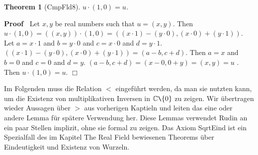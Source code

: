 \documentclass{article}
\newenvironment{forthel}{\begin{leftbar}}{\end{leftbar}}
\newenvironment{proof}{\noindent\textbf{Proof\ }}{\hspace*{\fill}$\Box$\medskip}
\newtheorem{theorem}{Theorem}
\newcommand{\CC}{\mathbb{C}}
\newcommand{\cmul}{\cdot}
\begin{document}
\begin{forthel}
\begin{theorem}[CmpFld8] $u \cmul (1,0) = u$.
\end{theorem}\begin{proof}
 Let $x,y$ be real numbers such that $u = (x,y)$.\newline
 Then $u  \cmul  (1,0) = ((x,y))  \cmul  (1,0) = ((x \cdot 1)-(y \cdot 0) , (x \cdot 0)+(y \cdot 1))$. \newline
Let $a = x \cdot 1$ and $b = y \cdot 0$ and $c = x \cdot 0$ and $d = y \cdot 1$.\newline
$((x \cdot 1)-(y \cdot 0) , (x \cdot 0)+(y \cdot 1)) = (a-b, c+d)$.\newline
Then $a = x$ and $b = 0$ and $c = 0$ and $d = y$.\newline
$(a-b, c+d) = (x-0 , 0+y) = (x,y) = u$ .\newline
Then $u \cmul (1,0) = u$.
\end{proof}



\end{forthel}
Im Folgenden muss die Relation $<$ eingeführt werden, da man sie nutzten kann, um die Existenz von multiplikativen Inversen in $\CC \verb|\| \{ 0 \}$ zu zeigen. Wir übertragen wieder Aussagen über $>$ aus vorherigen Kaptieln und leiten das eine oder andere Lemma für spätere Verwendung her. Diese Lemmas verwendet Rudin an ein paar Stellen implizit, ohne sie formal zu zeigen. Das Axiom SqrtEind ist ein Spezialfall des im Kapitel The Real Field bewiesenen Theorems über Eindeutigkeit und Existenz von Wurzeln.
\end{document}
